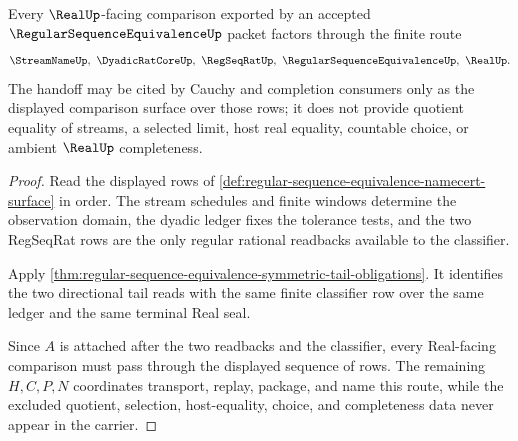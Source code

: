 \begin{theorem}
\label{thm:regular-sequence-equivalence-real-handoff}
Every $\RealUp$-facing comparison exported by an accepted $\RegularSequenceEquivalenceUp$ packet factors through the finite route
$$
\StreamNameUp,\ \DyadicRatCoreUp,\ \RegSeqRatUp,\ \RegularSequenceEquivalenceUp,\ \RealUp .
$$
The handoff may be cited by Cauchy and completion consumers only as the displayed comparison surface over those rows; it does not provide quotient equality of streams, a selected limit, host real equality, countable choice, or ambient $\RealUp$ completeness.
\end{theorem}
\begin{proof}
Read the displayed rows of \autoref{def:regular-sequence-equivalence-namecert-surface} in order. The stream schedules and finite windows determine the observation domain, the dyadic ledger fixes the tolerance tests, and the two RegSeqRat rows are the only regular rational readbacks available to the classifier.

Apply \autoref{thm:regular-sequence-equivalence-symmetric-tail-obligations}. It identifies the two directional tail reads with the same finite classifier row over the same ledger and the same terminal Real seal.

Since $A$ is attached after the two readbacks and the classifier, every Real-facing comparison must pass through the displayed sequence of rows. The remaining $H,C,P,N$ coordinates transport, replay, package, and name this route, while the excluded quotient, selection, host-equality, choice, and completeness data never appear in the carrier.
\end{proof}


\begin{closurestatus}{\RegularSequenceEquivalenceUp}
  \theoryclosure{\seedClosure}
  \formalstatus{\unformalizedV}
\end{closurestatus}
